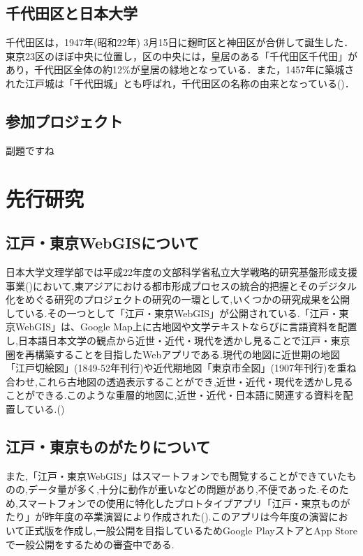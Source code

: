 \documentclass[a4paper, twoside]{jarticle}
\begin{document}
\begin{multicols}{2}
\subsection{千代田区と日本大学}
千代田区は，1947年(昭和22年) 3月15日に麹町区と神田区が合併して誕生した．東京23区のほぼ中央に位置し，区の中央には，皇居のある「千代田区千代田」があり，千代田区全体の約12\%が皇居の緑地となっている．また，1457年に築城された江戸城は「千代田城」とも呼ばれ，千代田区の名称の由来となっている(\cite{digi1})．

\subsection{参加プロジェクト}
副題ですね



\section{先行研究}


\subsection{江戸・東京WebGISについて}
日本大学文理学部では平成22年度の文部科学省私立大学戦略的研究基盤形成支援事業(\cite{monka})において,東アジアにおける都市形成プロセスの統合的把握とそのデジタル化をめぐる研究のプロジェクトの研究の一環として,いくつかの研究成果を公開 している.その一つとして「江戸・東京WebGIS」が公開されている.「江戸・東京WebGIS」は、Google Map上に古地図や文学テキストならびに言語資料を配置し,日本語日本文学の観点から近世・近代・現代を透かし見ることで江戸・東京圏を再構築することを目指したWebアプリである.現代の地図に近世期の地図「江戸切絵図」(1849-52年刊行)や近代期地図「東京市全図」(1907年刊行)を重ね合わせ,これら古地図の透過表示することができ,近世・近代・現代を透かし見ることができる.このような重層的地図に,近世・近代・日本語に関連する資料を配置している.(\cite{webgis_gaiyo})

\subsection{江戸・東京ものがたりについて}
また,「江戸・東京WebGIS」はスマートフォンでも閲覧することができていたものの,データ量が多く,十分に動作が重いなどの問題があり,不便であった.そのため,スマートフォンでの使用に特化したプロトタイプアプリ「江戸・東京ものがたり」が昨年度の卒業演習により作成された(\cite{houkokusyo_30}).このアプリは今年度の演習において正式版を作成し,一般公開を目指しているためGoogle PlayストアとApp Storeで一般公開をするための審査中である.


\end{multicols}
\end{document}
